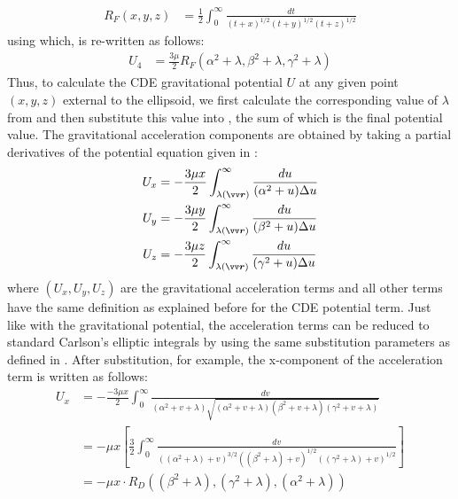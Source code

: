 \begin{align}
    R_F(x, y, z) &= \frac{1}{2} \int_0^\infty \frac{dt}{(t+x)^{1/2}(t+y)^{1/2}(t+z)^{1/2}}
    \label{eqn:carlson_RF}
\end{align}
using which,  is re-written as follows:
\begin{align}
    U_4 &= \frac{3\mu}{2} R_F(\alpha^2 + \lambda, \beta^2 + \lambda, \gamma^2 + \lambda)
    \label{eqn:ellipsoid_potential_split_4_carlson}
\end{align}
Thus, to calculate the \gls{CDE} gravitational potential $U$ at any given point $(x,y,z)$ external to the ellipsoid, we first calculate the corresponding value of $\lambda$ from  and then substitute this value into , the sum of which is the final potential value.
%
\newline\newline
%
The gravitational acceleration components are obtained by taking a partial derivatives of the potential equation given in  \parencite{scheeresBook}:
\begin{align}
    U_x &= -\frac{3\mu x}{2} \int_{\lambda(\bvector{r})}^{\infty} \frac{du}{(\alpha^2 + u) \Delta u}
    \label{eqn:grav_acc_x} \\
    U_y &= -\frac{3\mu y}{2} \int_{\lambda(\bvector{r})}^{\infty} \frac{du}{(\beta^2 + u) \Delta u}
    \label{eqn:grav_acc_y} \\
    U_z &= -\frac{3\mu z}{2} \int_{\lambda(\bvector{r})}^{\infty} \frac{du}{(\gamma^2 + u) \Delta u}
    \label{eqn:grav_acc_z}
\end{align}
where $(U_x, U_y, U_z)$ are the gravitational acceleration terms and all other terms have the same definition as explained before for the \gls{CDE} potential term. Just like with the gravitational potential, the acceleration terms can be reduced to standard Carlson's elliptic integrals by using the same substitution parameters as defined in . After substitution, for example, the x-component of the acceleration term is written as follows:
\begin{align}
    U_x &= -\frac{-3\mu x}{2} \int_{0}^{\infty} \frac{dv}{(\alpha^2 + v + \lambda)\sqrt{(\alpha^2 + v + \lambda)(\beta^2 + v + \lambda)(\gamma^2 + v + \lambda)}} \\
    &= -\mu x \left[\frac{3}{2} \int_0^\infty \frac{dv}{((\alpha^2 + \lambda) + v)^{3/2} ((\beta^2 + \lambda) + v)^{1/2} ((\gamma^2 + \lambda) + v)^{1/2}} \right] \\
    &= -\mu x \cdotp R_D((\beta^2 + \lambda), (\gamma^2 + \lambda), (\alpha^2 + \lambda))
    \label{eqn:grav_acc_x_carlson}
\end{align}
